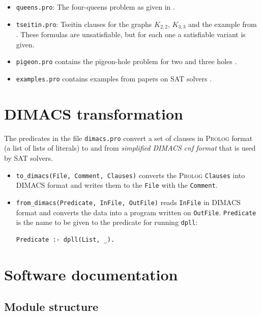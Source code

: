 \documentclass[11pt]{article}
\newcommand*{\p}[1]{\textup{\texttt{#1}}}
\newcommand*{\pl}{\textsc{Prolog}}
\begin{document}
\begin{itemize}

\item \p{queens.pro}: The four-queens problem as given in
\cite[Section 6.4]{mlcs}.

\item \p{tseitin.pro}: Tseitin clauses for the graphs $K_{2,2}$,
$K_{3,3}$ and the example from \cite[Section 4.5]{mlcs}. These formulas
are unsatisfiable, but for each one a satisfiable variant is given.

\item \p{pigeon.pro} contains the pigeon-hole problem for
two and three holes \cite[Exercise 6.4]{mlcs}.

\item \p{examples.pro} contains examples from papers on SAT
solvers \cite{mz,mlm,ms}.
\end{itemize}


\section{DIMACS transformation}

The predicates in the file \p{dimacs.pro} convert a set of clauses in
\pl{} format (a list of lists of literals) to and from \emph{simplified
DIMACS cnf format} that is used by SAT solvers.
\begin{itemize}
\item \p{to\_dimacs(File, Comment, Clauses)} converts the \pl{}
\p{Clauses} into DIMACS format and writes them to the \p{File} with the
\p{Comment}.
\item \p{from\_dimacs(Predicate, InFile, OutFile)} reads \p{InFile} in
DIMACS format and converts the data into a program written on
\p{OutFile}. \p{Predicate} is the name to be given to the predicate for
running \p{dpll}:
\begin{verbatim}
Predicate :- dpll(List, _).
\end{verbatim}
\end{itemize}

\newpage

\section{Software documentation}

\subsection{Module structure}
\end{document}
